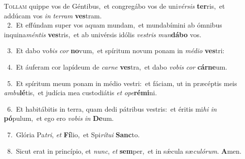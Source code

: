 \lettrine{\initial\textcolor{\initialcolor}{T}}{ollam} quippe vos de Géntibus,~\dagger et congregábo vos de uni\-\textit{vér}\-\textit{sis} \textbf{ter}\-ris,~\star et addúcam vos \textit{in} \textit{ter}\-\textit{ram} \textbf{ves}\-tram.\\
{\numbfont\textcolor{\numbcolor}{~2.}}~Et effúndam super vos aquam mundam,~\dagger et mundabímini ab ómnibus inquina\-\textit{mén}\-\textit{tis} \textbf{ves}\-tris,~\star et ab univérsis idólis \textit{ves}\-\textit{tris} \textit{mun}\-\textbf{dá}\textbf{bo} vos.\par
{\numbfont\textcolor{\numbcolor}{~3.}}~Et dabo vo\textit{bis} \textit{cor} \textbf{no}\-vum,~\star et spíritum novum ponam in \textit{mé}\-\textit{di}\textit{o} \textbf{ves}\-tri:\par
{\numbfont\textcolor{\numbcolor}{~4.}}~Et áuferam cor lapídeum de \textit{car}\-\textit{ne} \textbf{ves}\-tra,~\star et dabo \textit{vo}\-\textit{bis} \textit{cor} \textbf{cár}\-\textbf{ne}um.\par
{\numbfont\textcolor{\numbcolor}{~5.}}~Et spíritum meum ponam in médio vestri:~\dagger et fáciam, ut in præcéptis meis \textit{am}\-\textit{bu}\textbf{lé}tis,~\star et judícia mea custodiátis \textit{et} \textit{o}\-\textit{pe}\textbf{ré}\textbf{mi}ni.\par
{\numbfont\textcolor{\numbcolor}{~6.}}~Et habitábitis in terra, quam dedi pátribus vestris:~\dagger et éritis mi\textit{hi} \textit{in} \textbf{pó}\-pulum,~\star et ego ero \textit{vo}\-\textit{bis} \textit{in} \textbf{De}\-um.\par
{\numbfont\textcolor{\numbcolor}{~7.}}~Glória Pa\-\textit{tri}\-, \textit{et} \textbf{Fí}\-lio,~\star et Spi\-\textit{rí}\-\textit{tu}\textit{i} \textbf{Sanc}\-to.\par
{\numbfont\textcolor{\numbcolor}{~8.}}~Sicut erat in princípio, et \textit{nunc}\-, \textit{et} \textbf{sem}\-per,~\star et in sǽcula sæ\-\textit{cu}\-\textit{ló}\textit{rum}. \textbf{A}\-men.\par
